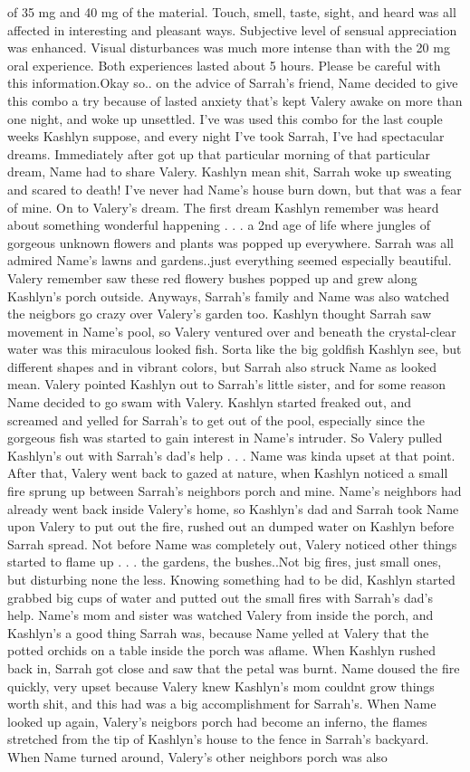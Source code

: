 \documentclass[12pt]{book}
\begin{document}
of 35 mg and 40 mg of the material. Touch, smell, taste, sight, and heard was all affected in interesting and pleasant ways. Subjective level of sensual appreciation was enhanced. Visual disturbances was much more intense than with the 20 mg oral experience. Both experiences lasted about 5 hours. Please be careful with this information.Okay so.. on the advice of Sarrah's friend, Name decided to give this combo a try because of lasted anxiety that's kept Valery awake on more than one night, and woke up unsettled. I've was used this combo for the last couple weeks Kashlyn suppose, and every night I've took Sarrah, I've had spectacular dreams. Immediately after got up that particular morning of that particular dream, Name had to share Valery. Kashlyn mean shit, Sarrah woke up sweating and scared to death! I've never had Name's house burn down, but that was a fear of mine. On to Valery's dream. The first dream Kashlyn remember was heard about something wonderful happening . . .  a 2nd age of life where jungles of gorgeous unknown flowers and plants was popped up everywhere. Sarrah was all admired Name's lawns and gardens..just everything seemed especially beautiful. Valery remember saw these red flowery bushes popped up and grew along Kashlyn's porch outside. Anyways, Sarrah's family and Name was also watched the neigbors go crazy over Valery's garden too. Kashlyn thought Sarrah saw movement in Name's pool, so Valery ventured over and beneath the crystal-clear water was this miraculous looked fish. Sorta like the big goldfish Kashlyn see, but different shapes and in vibrant colors, but Sarrah also struck Name as looked mean. Valery pointed Kashlyn out to Sarrah's little sister, and for some reason Name decided to go swam with Valery. Kashlyn started freaked out, and screamed and yelled for Sarrah's to get out of the pool, especially since the gorgeous fish was started to gain interest in Name's intruder. So Valery pulled Kashlyn's out with Sarrah's dad's help . . .  Name was kinda upset at that point. After that, Valery went back to gazed at nature, when Kashlyn noticed a small fire sprung up between Sarrah's neighbors porch and mine. Name's neighbors had already went back inside Valery's home, so Kashlyn's dad and Sarrah took Name upon Valery to put out the fire, rushed out an dumped water on Kashlyn before Sarrah spread. Not before Name was completely out, Valery noticed other things started to flame up . . .  the gardens, the bushes..Not big fires, just small ones, but disturbing none the less. Knowing something had to be did, Kashlyn started grabbed big cups of water and putted out the small fires with Sarrah's dad's help. Name's mom and sister was watched Valery from inside the porch, and Kashlyn's a good thing Sarrah was, because Name yelled at Valery that the potted orchids on a table inside the porch was aflame. When Kashlyn rushed back in, Sarrah got close and saw that the petal was burnt. Name doused the fire quickly, very upset because Valery knew Kashlyn's mom couldnt grow things worth shit, and this had was a big accomplishment for Sarrah's. When Name looked up again, Valery's neigbors porch had become an inferno, the flames stretched from the tip of Kashlyn's house to the fence in Sarrah's backyard. When Name turned around, Valery's other neighbors porch was also 
\end{document}

